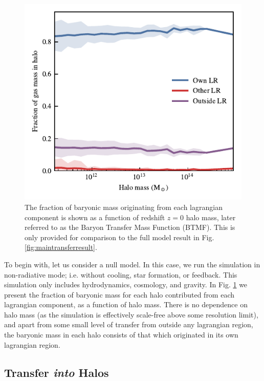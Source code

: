 \begin{figure}
	\centering
	\includegraphics[width=\columnwidth]{figures/s50gadget/component_fraction_vs_halo_mass_gas.pdf}
	\vspace{-0.7cm}
	\caption{
	The fraction of baryonic mass originating from each lagrangian component is
	shown as a function of redshift $z=0$ halo mass, later referred to as the
	Baryon Transfer Mass Function (BTMF). This is only provided for comparison to
	the full model result in Fig. \ref{fig:maintransferresult}.
	}
	\label{fig:nonradiativetransfer}
\end{figure}

To begin with, let us consider a null model. In this case, we run the simulation
in non-radiative mode; i.e. without cooling, star formation, or feedback. This
simulation only includes hydrodynamics, cosmology, and gravity. In Fig.
\ref{fig:nonradiativetransfer} we present the fraction of baryonic mass for
each halo contributed from each lagrangian component, as a function of halo
mass. There is no dependence on halo mass (as the simulation is effectively
scale-free above some resolution limit), and apart from some small level of 
transfer from outside any lagrangian region, the baryonic mass in each halo
consists of that which originated in its own lagrangian region.

\subsection{Transfer \emph{into} Halos}

